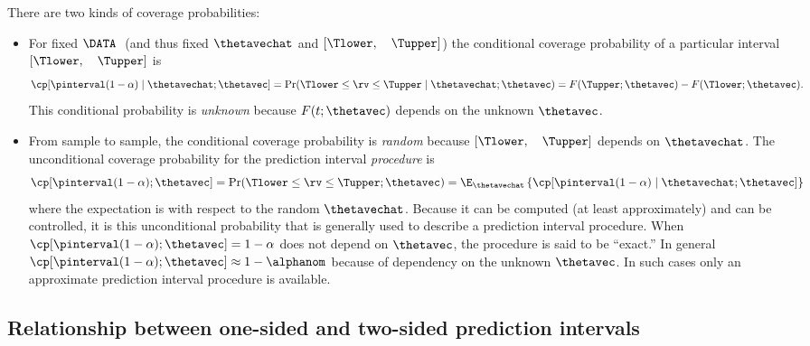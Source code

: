There are two kinds of coverage probabilities:
\begin{itemize}
\item 
For fixed $\DATA~$   (and thus fixed $\thetavechat$ and $[
\Tlower, \quad \Tupper ]$) the conditional coverage probability 
of a particular interval $[\Tlower, \quad \Tupper ]$ is 
\begin{equation}
\label{equation:cond.coverage}
\cp[\pinterval(1-\alpha) \mid \thetavechat ; \thetavec]
	= \Pr(\Tlower \leq \rv \leq \Tupper \mid \thetavechat ; \thetavec )
	= F(\Tupper;\thetavec)-F(\Tlower;\thetavec).
\end{equation}
This conditional probability is {\em unknown} because $F(t;\thetavec)$
depends on the unknown $\thetavec$.  
\item 
From sample to sample, the conditional coverage probability is
{\em random} because $[ \Tlower, \quad \Tupper ]$ depends on $\thetavechat$.
The unconditional coverage probability for the prediction interval
{\em procedure} is
\begin{equation}
\label{equation:uncond.coverage}
	\cp[\pinterval(1-\alpha) ;\thetavec] =
\Pr(\Tlower \leq \rv \leq\Tupper ; \thetavec) =
		 \E_{\thetavechat} \left \{\cp[\pinterval(1-\alpha) 
	\mid \thetavechat ;\thetavec]
			   \right \}
\end{equation}
where the expectation is with respect to the random $\thetavechat$.
Because it can be computed (at least approximately) and can be
controlled, it is this unconditional probability that is generally used to
describe a prediction interval procedure. When $\cp[\pinterval(1-\alpha) ;
\thetavec]=1-\alpha$ does not depend on $\thetavec$, the procedure is said 
to be ``exact.'' In general $\cp[\pinterval(1-\alpha) ;\thetavec]
\approx 1-\alphanom$ because of dependency on the unknown $\thetavec$.
In such cases only an approximate prediction interval procedure
is available.  
\end{itemize}

\subsection{Relationship between one-sided and
two-sided prediction intervals}

